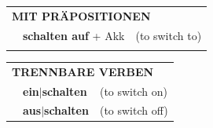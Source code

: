 \documentclass[10pt,a4paper]{revtex4-2}
\begin{document}
\begin{verbbox}
\vspace{10pt}

\begin{tabular}{lll}
\multicolumn{3}{l}{\textbf{MIT PRÄPOSITIONEN}}\\
& \textbf{schalten auf} + Akk & (to switch to)\\
\vspace{10pt}
\end{tabular}
\hfill
\begin{tabular}{lll}
\multicolumn{3}{l}{\textbf{TRENNBARE VERBEN}}\\
& \textbf{ein$|$schalten} & (to switch on)\\
& \textbf{aus$|$schalten} & (to switch off)\\
\end{tabular}

\vspace{-5pt}
\end{verbbox}
\end{document}
